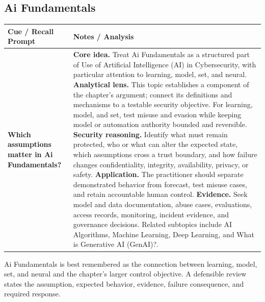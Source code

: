 \documentclass[11pt]{article}
\newcommand{\CornellHeader}{%
\rowcolor{Navy}\color{white}\bfseries Cue / Recall Prompt & \color{white}\bfseries Notes / Analysis\\\hline}
\newcommand{\CornellRow}[2]{%
\cellcolor{CueGray}\RaggedRight\textbf{#1} & \RaggedRight #2\\\hline}
\begin{document}
\subsection*{Ai Fundamentals}
\begin{longtable}{>{\RaggedRight\arraybackslash}p{}|>{\RaggedRight\arraybackslash}p{}}
\CornellHeader
\CornellRow{Which assumptions matter in Ai Fundamentals?}{\textbf{Core idea.} Treat Ai Fundamentals as a structured part of Use of Artificial Intelligence (AI) in Cybersecurity, with particular attention to learning, model, set, and neural. \textbf{Analytical lens.} This topic establishes a component of the chapter's argument; connect its definitions and mechanisms to a testable security objective. For learning, model, and set, test misuse and evasion while keeping model or automation authority bounded and reversible. \textbf{Security reasoning.} Identify what must remain protected, who or what can alter the expected state, which assumptions cross a trust boundary, and how failure changes confidentiality, integrity, availability, privacy, or safety. \textbf{Application.} The practitioner should separate demonstrated behavior from forecast, test misuse cases, and retain accountable human control. \textbf{Evidence.} Seek model and data documentation, abuse cases, evaluations, access records, monitoring, incident evidence, and governance decisions. Related subtopics include AI Algorithms, Machine Learning, Deep Learning, and What is Generative AI (GenAI)?.}
\end{longtable}
\begin{topicsummary}
Ai Fundamentals is best remembered as the connection between learning, model, set, and neural and the chapter's larger control objective. A defensible review states the assumption, expected behavior, evidence, failure consequence, and required response.
\end{topicsummary}
\end{document}
